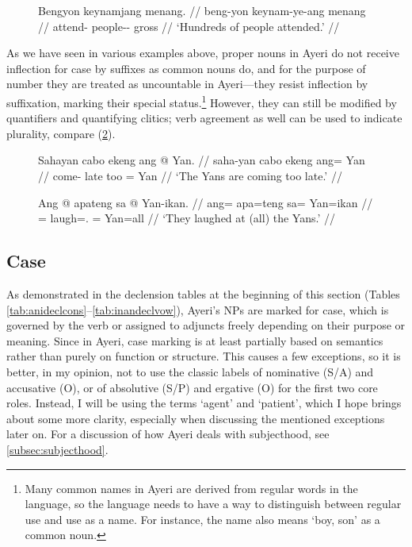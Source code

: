 \begin{figure}
\ex\label{ex:keynamplur}%
\begingl
	\gla Bengyon keynamjang menang. //
	\glb beng-yon keynam-ye-ang menang //
	\glc attend-\TsgN{} people-\Pl{}-\Aarg{} gross //
	\glft `Hundreds of people attended.' //
\endgl\xe
\end{figure}

%
As we have seen in various examples above, proper nouns in Ayeri do not receive
inflection for case by suffixes as common nouns do, and for the purpose of
number they are treated as uncountable in Ayeri---they resist inflection by
suffixation, marking their special status.\footnote{Many common names in Ayeri
are derived from regular words in the language, so the language needs to have a
way to distinguish between regular use and use as a name. For instance, the
name  also means `boy, son' as a common noun.} However, they can
still be modified by quantifiers and quantifying clitics; verb agreement as
well can be used to indicate plurality, compare (\ref{ex:verbplur}).

\begin{figure}[h]
\pex\label{ex:verbplur}
\a\begingl
	\gla Sahayan cabo ekeng ang @ Yan. //
	\glb saha-yan cabo ekeng ang= Yan //
	\glc come-\TplM{} late too \Aarg{}= Yan //
	\glft `The Yans are coming too late.' //
\endgl

\a\begingl
	\gla Ang @ apateng sa @ Yan-ikan. //
	\glb ang= apa=teng sa= Yan=ikan //
	\glc \AgtT{}= laugh=\TplF{}.\Aarg{} \Parg{}= Yan=all //
	\glft `They laughed at (all) the Yans.' //
\endgl
\xe
\end{figure}


\subsection{Case}
\label{subsec:case}

As demonstrated in the declension tables at the beginning of this section
(Tables \ref{tab:anideclcons}--\ref{tab:inandeclvow}), Ayeri's NPs are marked
for case, which is governed by the verb or assigned to adjuncts freely
depending on their purpose or meaning. Since in Ayeri, case marking is at least
partially based on semantics rather than purely on function or structure. This
causes a few exceptions, so it is better, in my opinion, not to use the classic
labels of nominative (S/A) and accusative (O), or of absolutive (S/P) and
ergative (O) for the first two core roles. Instead, I will be using the terms
`agent' and `patient', which I hope brings about some more clarity, especially
when discussing the mentioned exceptions later on. For a discussion of how
Ayeri deals with subjecthood, see \autoref{subsec:subjecthood}.

